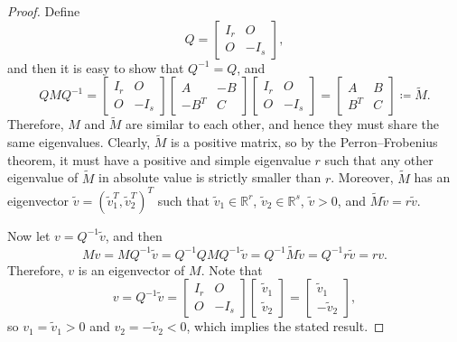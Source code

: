 \documentclass{article}
\theoremstyle{plain}
\theoremstyle{definition}
\theoremstyle{remark}
\begin{document}
\begin{proof}
Define
\[
Q=\begin{bmatrix}I_{r} & O\\
O & -I_{s}
\end{bmatrix},
\]
and then it is easy to show that $Q^{-1}=Q$, and
\[
QMQ^{-1}=\begin{bmatrix}I_{r} & O\\
O & -I_{s}
\end{bmatrix}\begin{bmatrix}A & -B\\
-B^{T} & C
\end{bmatrix}\begin{bmatrix}I_{r} & O\\
O & -I_{s}
\end{bmatrix}=\begin{bmatrix}A & B\\
B^{T} & C
\end{bmatrix}\coloneqq\tilde{M}.
\]
Therefore, $M$ and $\tilde{M}$ are similar to each other, and hence
they must share the same eigenvalues. Clearly, $\tilde{M}$ is a positive
matrix, so by the Perron--Frobenius theorem, it must have a positive
and simple eigenvalue $r$ such that any other eigenvalue of $\tilde{M}$
in absolute value is strictly smaller than $r$. Moreover, $\tilde{M}$
has an eigenvector $\tilde{v}=(\tilde{v}_{1}^{T},\tilde{v}_{2}^{T})^{T}$
such that $\tilde{v}_{1}\in\mathbb{R}^{r}$, $\tilde{v}_{2}\in\mathbb{R}^{s}$,
$\tilde{v}>0$, and $\tilde{M}\tilde{v}=r\tilde{v}$.

Now let $v=Q^{-1}\tilde{v}$, and then
\[
Mv=MQ^{-1}\tilde{v}=Q^{-1}QMQ^{-1}\tilde{v}=Q^{-1}\tilde{M}\tilde{v}=Q^{-1}r\tilde{v}=rv.
\]
Therefore, $v$ is an eigenvector of $M$. Note that
\[
v=Q^{-1}\tilde{v}=\begin{bmatrix}I_{r} & O\\
O & -I_{s}
\end{bmatrix}\begin{bmatrix}\tilde{v}_{1}\\
\tilde{v}_{2}
\end{bmatrix}=\begin{bmatrix}\tilde{v}_{1}\\
-\tilde{v}_{2}
\end{bmatrix},
\]
so $v_{1}=\tilde{v}_{1}>0$ and $v_{2}=-\tilde{v}_{2}<0$, which implies
the stated result.
\end{proof}
\end{document}
